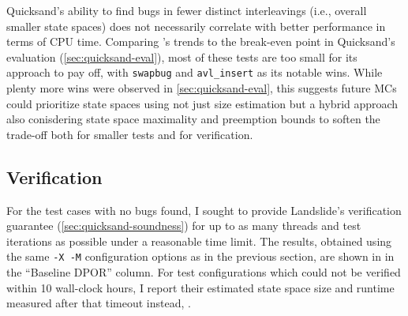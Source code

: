 Quicksand's ability to find bugs in fewer distinct interleavings (i.e., overall smaller state spaces)
does not necessarily correlate with better performance in terms of CPU time.
Comparing 's trends
to the break-even point in Quicksand's evaluation (\cref{sec:quicksand-eval}),
most of these tests are too small for its approach to pay off,
with {\tt swapbug} and {\tt avl\_insert} as its notable wins.
While plenty more wins were observed in \cref{sec:quicksand-eval},
this suggests
future MCs could prioritize state spaces using not just size estimation
but a hybrid approach also conisdering state space maximality and preemption bounds \cite{chess-icb}
to soften the trade-off
both for smaller tests and for verification.

\subsection{Verification}
\label{sec:tm-verif}

For the test cases with no bugs found, I sought to provide Landslide's verification guarantee
(\cref{sec:quicksand-soundness})
for up to as many threads and test iterations as possible under a reasonable time limit.
The results, obtained using the same {\tt -X -M} configuration options as
in the previous section,
are shown in  in the ``Baseline DPOR'' column.
For test configurations which could not be verified
within 10 wall-clock hours,
I report their estimated state space size and runtime measured after that timeout instead,
.

